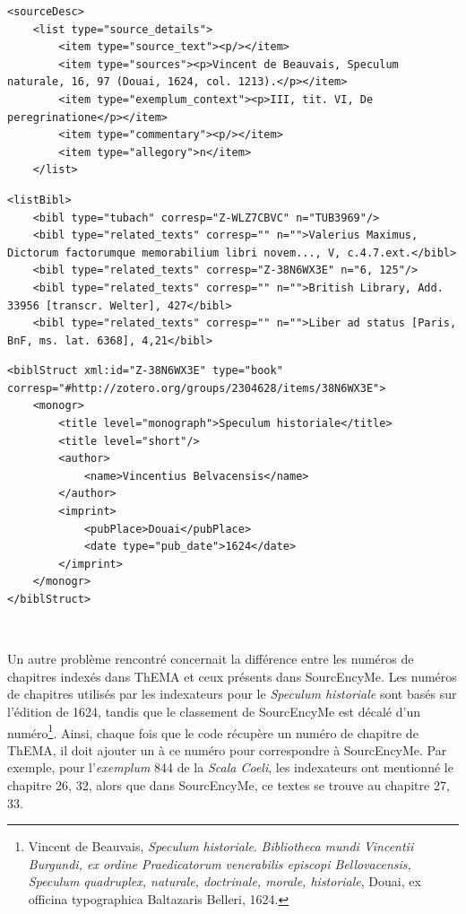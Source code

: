 \begin{lstlisting}[breaklines=true]
<sourceDesc>
	<list type="source_details">
		<item type="source_text"><p/></item>
		<item type="sources"><p>Vincent de Beauvais, Speculum naturale, 16, 97 (Douai, 1624, col. 1213).</p></item>
		<item type="exemplum_context"><p>III, tit. VI, De peregrinatione</p></item>
		<item type="commentary"><p/></item>
		<item type="allegory">n</item>
	</list>
\end{lstlisting}

\begin{lstlisting}[breaklines=true]
<listBibl>
	<bibl type="tubach" corresp="Z-WLZ7CBVC" n="TUB3969"/>
	<bibl type="related_texts" corresp="" n="">Valerius Maximus, Dictorum factorumque memorabilium libri novem..., V, c.4.7.ext.</bibl>
	<bibl type="related_texts" corresp="Z-38N6WX3E" n="6, 125"/>
	<bibl type="related_texts" corresp="" n="">British Library, Add. 33956 [transcr. Welter], 427</bibl>
	<bibl type="related_texts" corresp="" n="">Liber ad status [Paris, BnF, ms. lat. 6368], 4,21</bibl>
\end{lstlisting}

\begin{lstlisting}[breaklines=true]
<biblStruct xml:id="Z-38N6WX3E" type="book" corresp="#http://zotero.org/groups/2304628/items/38N6WX3E">
	<monogr>
		<title level="monograph">Speculum historiale</title>
		<title level="short"/>
		<author>
			<name>Vincentius Belvacensis</name>
		</author>
		<imprint>
			<pubPlace>Douai</pubPlace>
			<date type="pub_date">1624</date>
		</imprint>
	</monogr>
</biblStruct>
\end{lstlisting}

\

Un autre problème rencontré concernait la différence entre les numéros de chapitres indexés dans ThEMA et ceux présents dans SourcEncyMe. Les numéros de chapitres utilisés par les indexateurs pour le \textit{Speculum historiale} sont basés sur l'édition de 1624, tandis que le classement de SourcEncyMe est décalé d'un numéro\footnote{Vincent de Beauvais, \textit{Speculum historiale}. \textit{Bibliotheca mundi Vincentii Burgundi, ex ordine Praedicatorum venerabilis episcopi Bellovacensis, Speculum quadruplex, naturale, doctrinale, morale, historiale}, Douai, ex officina typographica Baltazaris Belleri, 1624.}. Ainsi, chaque fois que le code récupère un numéro de chapitre de ThEMA, il doit ajouter un à ce numéro pour correspondre à SourcEncyMe. Par exemple, pour l'\textit{exemplum} 844 de la \textit{Scala Coeli}, les indexateurs ont mentionné le chapitre 26, 32, alors que dans SourcEncyMe, ce textes se trouve au chapitre 27, 33. \\

